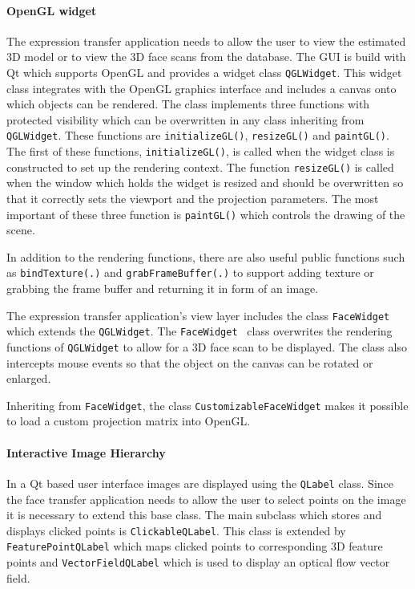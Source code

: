 \documentclass[11pt,a4paper]{report}
\begin{document}
\paragraph{OpenGL widget}
The expression transfer application needs to allow the user to view the
estimated 3D model or to view the 3D face scans from the database. The GUI is build with Qt
which supports OpenGL and provides a widget class \texttt{QGLWidget}. This
widget class integrates with the OpenGL graphics interface and includes a canvas
onto which objects can be rendered. The class implements three functions with
protected visibility which
can be overwritten in any class inheriting from \texttt{QGLWidget}. These
functions are \texttt{initializeGL()}, \texttt{resizeGL()} and
\texttt{paintGL()}. The first of these functions, \texttt{initializeGL()}, is
called when the widget class is constructed to set up the rendering context. The function \texttt{resizeGL()} is
called when the window which holds the widget is resized and should be
overwritten so that it correctly sets the viewport and the projection parameters. The most important of
these three function is \texttt{paintGL()} which controls the drawing of the
scene.

In addition to the rendering functions, there are also useful public functions
such as \texttt{bindTexture(.)} and \texttt{grabFrameBuffer(.)} to support
adding texture or grabbing the frame buffer and returning it in form of an
image.

The expression transfer application's view layer includes the class
\texttt{FaceWidget} which extends the \texttt{QGLWidget}. The \texttt{FaceWidget
} class overwrites the rendering functions of \texttt{QGLWidget} to allow for a
3D face scan to be displayed. The class also intercepts mouse events so that the
object on the canvas can be rotated or enlarged.

Inheriting from \texttt{FaceWidget}, the class \texttt{CustomizableFaceWidget}
makes it possible to load a custom projection matrix into OpenGL.

\paragraph{Interactive Image Hierarchy}
In a Qt based user interface images are displayed using the \texttt{QLabel} class. Since the
face transfer application needs to allow the user to select points on the image
it is necessary to extend this base class. The main subclass which stores and
displays clicked points is \texttt{ClickableQLabel}. This class is extended by
\texttt{FeaturePointQLabel} which maps clicked points to corresponding 3D
feature points and \texttt{VectorFieldQLabel} which is used to display an
optical flow vector field.
\end{document}

